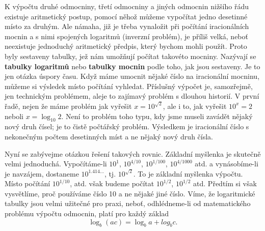     K výpočtu druhé odmocniny, třetí odmocniny a jiných odmocnin nižšího řádu existuje aritmetický
    postup, pomocí něhož můžeme vypočítat jedno desetinné místo za druhým. Ale námaha, již je třeba
    vynaložit při počítání iracionálních mocnin a s nimi spojených logaritmů (inverzní problém), je
    příliš velká, neboť neexistuje jednoduchý aritmetický předpis, který bychom mohli použít. Proto
    byly sestaveny tabulky, jež nám umožňují počítat takovéto mocniny. Nazývají se \textbf{tabulky
    logaritmů} nebo \textbf{tabulky mocnin} podle toho, jak jsou sestaveny. Je to jen otázka úspory
    času. Když máme umocnit nějaké číslo na iracionální mocninu, můžeme si výsledek místo počítání
    vyhledat. Příslušný výpočet je, samozřejmě, jen technickým problémem, aleje to zajímavý problém
    s dlouhou historií. V první řadě, nejen že máme problém jak vyřešit \(x=10^{\sqrt{2}}\), ale i
    to, jak vyřešit \(10^x=2\) neboli \(x= \log_{10}2\). Není to problém toho typu, kdy jsme
    museli zavádět nějaký nový druh čísel; je to čistě počtářský problém. Výsledkem je iracionální
    číslo s nekonečným počtem desetinných míst a ne nějaký nový druh čísla.

    Nyní se zabývejme otázkou řešení takových rovnic. Základní myšlenka je skutečně velmi
    jednoduchá. Vypočítáme-li \(10^1\), \(10^{4/10}\), \(10^{1/100}\), \(10^{4/1000}\) atd. a
    vynásobíme-li je navzájem, dostaneme \(10^{1.414\ldots}\), tj. \(10^{\sqrt{2}}\). To je
    základní myšlenka výpočtu. Místo počítání \(10^{1/10}\), atd. však budeme počítat \(10^{1/2}\),
    \(10^{1/2}\) atd. Předtím si však vysvětlíme, proč používáme číslo \num{10} a ne nějaké jiné
    číslo. Víme, že logaritmické tabulky jsou velmi užitečné pro praxi, neboť, odhlédneme-li od
    matematického problému výpočtu odmocnin, platí pro každý základ
    \begin{equation}\label{fyz:eq693}
      \log_b(ac)=\log_ba+log_bc.
    \end{equation}
  
